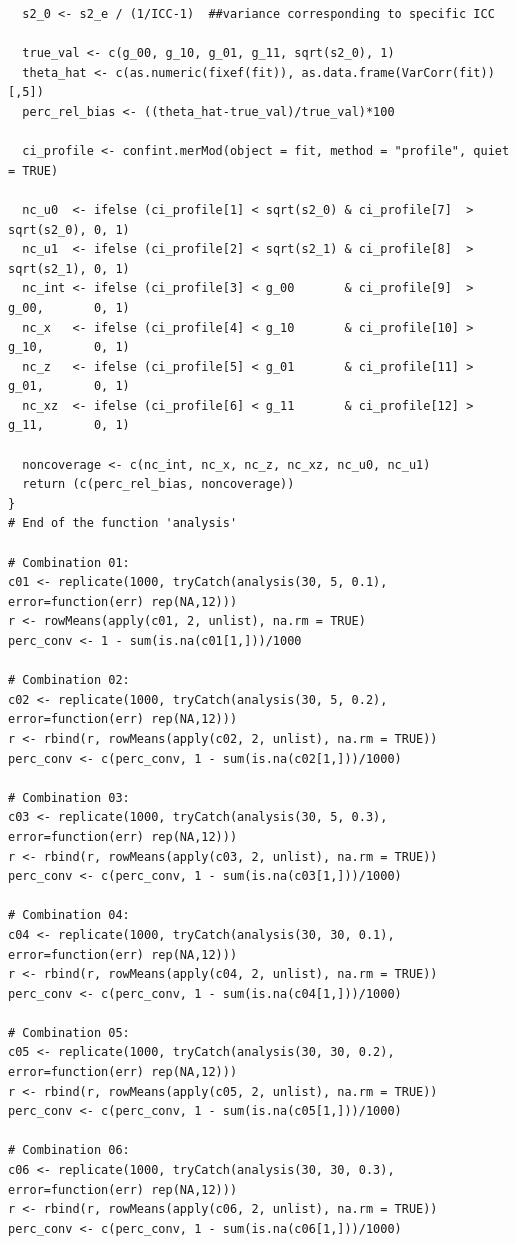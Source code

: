 \documentclass[12pt,oneside,a4paper]{reedthesis}
\begin{document}
\begin{verbatim}
  s2_0 <- s2_e / (1/ICC-1)  ##variance corresponding to specific ICC
  
  true_val <- c(g_00, g_10, g_01, g_11, sqrt(s2_0), 1)
  theta_hat <- c(as.numeric(fixef(fit)), as.data.frame(VarCorr(fit))[,5])
  perc_rel_bias <- ((theta_hat-true_val)/true_val)*100
  
  ci_profile <- confint.merMod(object = fit, method = "profile", quiet = TRUE)
  
  nc_u0  <- ifelse (ci_profile[1] < sqrt(s2_0) & ci_profile[7]  > sqrt(s2_0), 0, 1)
  nc_u1  <- ifelse (ci_profile[2] < sqrt(s2_1) & ci_profile[8]  > sqrt(s2_1), 0, 1)
  nc_int <- ifelse (ci_profile[3] < g_00       & ci_profile[9]  > g_00,       0, 1)
  nc_x   <- ifelse (ci_profile[4] < g_10       & ci_profile[10] > g_10,       0, 1)
  nc_z   <- ifelse (ci_profile[5] < g_01       & ci_profile[11] > g_01,       0, 1)
  nc_xz  <- ifelse (ci_profile[6] < g_11       & ci_profile[12] > g_11,       0, 1)
  
  noncoverage <- c(nc_int, nc_x, nc_z, nc_xz, nc_u0, nc_u1)
  return (c(perc_rel_bias, noncoverage))
}
# End of the function 'analysis'

# Combination 01:
c01 <- replicate(1000, tryCatch(analysis(30, 5, 0.1), error=function(err) rep(NA,12)))
r <- rowMeans(apply(c01, 2, unlist), na.rm = TRUE)
perc_conv <- 1 - sum(is.na(c01[1,]))/1000

# Combination 02:
c02 <- replicate(1000, tryCatch(analysis(30, 5, 0.2), error=function(err) rep(NA,12)))
r <- rbind(r, rowMeans(apply(c02, 2, unlist), na.rm = TRUE))
perc_conv <- c(perc_conv, 1 - sum(is.na(c02[1,]))/1000)

# Combination 03:
c03 <- replicate(1000, tryCatch(analysis(30, 5, 0.3), error=function(err) rep(NA,12)))
r <- rbind(r, rowMeans(apply(c03, 2, unlist), na.rm = TRUE))
perc_conv <- c(perc_conv, 1 - sum(is.na(c03[1,]))/1000)

# Combination 04:
c04 <- replicate(1000, tryCatch(analysis(30, 30, 0.1), error=function(err) rep(NA,12)))
r <- rbind(r, rowMeans(apply(c04, 2, unlist), na.rm = TRUE))
perc_conv <- c(perc_conv, 1 - sum(is.na(c04[1,]))/1000)

# Combination 05:
c05 <- replicate(1000, tryCatch(analysis(30, 30, 0.2), error=function(err) rep(NA,12)))
r <- rbind(r, rowMeans(apply(c05, 2, unlist), na.rm = TRUE))
perc_conv <- c(perc_conv, 1 - sum(is.na(c05[1,]))/1000)

# Combination 06:
c06 <- replicate(1000, tryCatch(analysis(30, 30, 0.3), error=function(err) rep(NA,12)))
r <- rbind(r, rowMeans(apply(c06, 2, unlist), na.rm = TRUE))
perc_conv <- c(perc_conv, 1 - sum(is.na(c06[1,]))/1000)


\end{verbatim}
\end{document}
